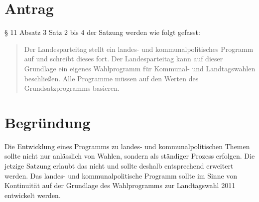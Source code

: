 \section{Antrag}

§ 11 Absatz 3 Satz 2 bis 4 der Satzung werden wie folgt gefasst:

\begin{quote}
Der Landesparteitag stellt ein landes- und kommunalpolitisches Programm auf und schreibt dieses fort. Der Landesparteitag kann auf dieser Grundlage ein eigenes Wahlprogramm für Kommunal- und Landtagswahlen beschließen. Alle Programme müssen auf den Werten des Grundsatzprogramms basieren.

\end{quote}
\section{Begründung}

Die Entwicklung eines Programms zu landes- und kommunalpolitischen Themen sollte nicht nur anlässlich von Wahlen, sondern als ständiger Prozess erfolgen. Die jetzige Satzung erlaubt das nicht und sollte deshalb entsprechend erweitert werden. Das landes- und kommunalpolitische Programm sollte im Sinne von Kontinuität auf der Grundlage des Wahlprogramms zur Landtagswahl 2011 entwickelt werden.
